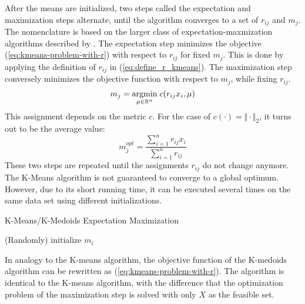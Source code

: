 After the means are initialized, two steps called the expectation and maximization steps alternate, until the algorithm converges to a set of $r_{ij}$ and $m_j$.
The nomenclature is based on the larger class of expectation-maxmization algorithms described by \cite{Dempster1977}.
The expectation step minimizes the objective (\ref{eq:kmeans-problem-with-r}) with respect to $r_{ij}$ for fixed $m_j$.
This is done by applying the definition of $r_{ij}$ in (\ref{eq:define_r_kmeans}).
The maximization step conversely minimizes the objective function with respect to $m_j$, while fixing $r_{ij}$. 
\begin{equation}
  \label{eq:definition-mi-update-kmeans}
  m_j = \underset{\mu\in\mathbb{R}^n}{\operatorname{argmin}}\; c(r_{ij}x_i,\mu)
\end{equation}
This assignment depends on the metric $c$. For the case of $c(\cdot ) = \Vert \cdot \Vert_2$, it turns out to be the average value:
\begin{equation}
  \label{eq:mj-as-average}
  m_j^{opt} = \frac{\sum_{i=1}^nr_{ij}x_i}{\sum_{i=1}^nr_{ij}}
\end{equation}
These two steps are repeated until the assignments $r_{ij}$ do not change anymore.
The K-Means algorithm is not guaranteed to converge to a global optimum.
However, due to its short running time, it can be executed several times on the same data set using different initializations.
\begin{algorithm}
  \label{alg:kmeans}
  \caption{K-Means/K-Medoids Expectation Maximization}
  
  (Randomly) initialize $m_i$\;
\end{algorithm}

In analogy to the K-means algorithm, the objective function of the K-medoids algorithm can be rewritten as (\ref{eq:kmeans-problem-with-r}).
The algorithm is identical to the K-means algorithm, with the difference that the optimization problem of the maximization step is solved with only $X$ as the feasible set.


